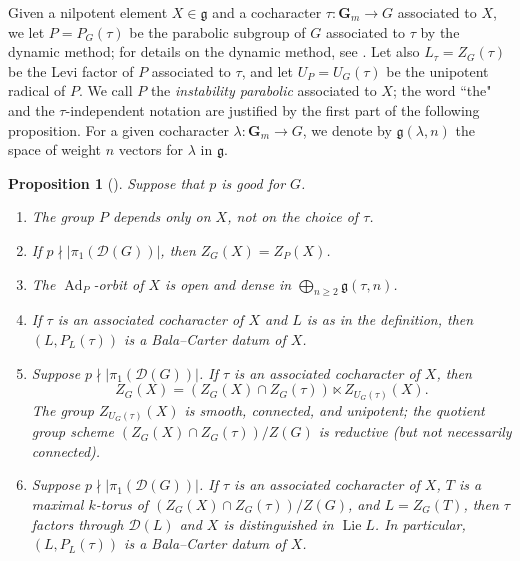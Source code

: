 \documentclass[11pt,reqno]{amsart}
\newtheorem{prop}[theorem]{Proposition}
\theoremstyle{definition}
\newcommand{\bG}{{\mathbf G}}
\newcommand{\sD}{{\mathscr D}}
\newcommand{\fg}{\mathfrak{g}}
\DeclareMathOperator{\Ad}{Ad}
\DeclareMathOperator{\Lie}{Lie}
\begin{document}
Given a nilpotent element $X \in \fg$ and a cocharacter $\tau: \bG_m \to G$ associated to $X$, we let $P = P_G(\tau)$ be the parabolic subgroup of $G$ associated to $\tau$ by the dynamic method; for details on the dynamic method, see \cite[\S 2.1]{CGP}. Let also $L_\tau = Z_G(\tau)$ be the Levi factor of $P$ associated to $\tau$, and let $U_P = U_G(\tau)$ be the unipotent radical of $P$. We call $P$ the \textit{instability parabolic} associated to $X$; the word ``the" and the $\tau$-independent notation are justified by the first part of the following proposition. For a given cocharacter $\lambda: \bG_m \to G$, we denote by $\fg(\lambda, n)$ the space of weight $n$ vectors for $\lambda$ in $\fg$.

\begin{prop}[{\cite[5.9-11]{Jantzen-nilpotent}}]\label{proposition:properties-of-instability-parabolic}
Suppose that $p$ is good for $G$.
\begin{enumerate}
    \item\label{item:instability-parabolic-is-choiceless} The group $P$ depends only on $X$, not on the choice of $\tau$.
    \item\label{item:instability-parabolic-same-centralizer} If $p \nmid |\pi_1(\sD(G))|$, then $Z_G(X) = Z_P(X)$.
    \item\label{item:instability-parabolic-open-dense-orbit} The $\Ad_P$-orbit of $X$ is open and dense in $\bigoplus_{n \geq 2} \fg(\tau, n)$.
    \item\label{item:instability-parabolic-bala-carter} If $\tau$ is an associated cocharacter of $X$ and $L$ is as in the definition, then $(L, P_L(\tau))$ is a Bala--Carter datum of $X$.
    \item\label{item:instability-parabolic-semidirect-product} Suppose $p \nmid |\pi_1(\sD(G))|$. If $\tau$ is an associated cocharacter of $X$, then
    \[
    Z_G(X) = (Z_G(X) \cap Z_G(\tau)) \ltimes Z_{U_G(\tau)}(X).
    \]
    The group $Z_{U_G(\tau)}(X)$ is smooth, connected, and unipotent; the quotient group scheme $(Z_G(X) \cap Z_G(\tau))/Z(G)$ is reductive (but not necessarily connected).
    \item\label{item:instability-parabolic-levi} Suppose $p \nmid |\pi_1(\sD(G))|$. If $\tau$ is an associated cocharacter of $X$, $T$ is a maximal $k$-torus of $(Z_G(X) \cap Z_G(\tau))/Z(G)$, and $L = Z_G(T)$, then $\tau$ factors through $\sD(L)$ and $X$ is distinguished in $\Lie L$. In particular, $(L, P_L(\tau))$ is a Bala--Carter datum of $X$.
\end{enumerate}
\end{prop}
\end{document}
